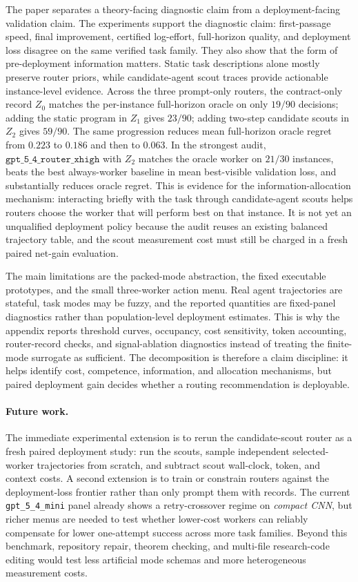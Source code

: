 \documentclass{article}
\begin{document}
The paper separates a theory-facing diagnostic claim from a deployment-facing validation claim.
The experiments support the diagnostic claim: first-passage speed, final improvement, certified log-effort, full-horizon quality, and deployment loss disagree on the same verified task family.
They also show that the form of pre-deployment information matters.
Static task descriptions alone mostly preserve router priors, while candidate-agent scout traces provide actionable instance-level evidence.
Across the three prompt-only routers, the contract-only record \(Z_0\) matches the per-instance full-horizon oracle on only \(19/90\) decisions; adding the static program in \(Z_1\) gives \(23/90\); adding two-step candidate scouts in \(Z_2\) gives \(59/90\).
The same progression reduces mean full-horizon oracle regret from \(0.223\) to \(0.186\) and then to \(0.063\).
In the strongest audit, \(\texttt{gpt\_5\_4\_router\_xhigh}\) with \(Z_2\) matches the oracle worker on \(21/30\) instances, beats the best always-worker baseline in mean best-visible validation loss, and substantially reduces oracle regret.
This is evidence for the information-allocation mechanism: interacting briefly with the task through candidate-agent scouts helps routers choose the worker that will perform best on that instance.
It is not yet an unqualified deployment policy because the audit reuses an existing balanced trajectory table, and the scout measurement cost must still be charged in a fresh paired net-gain evaluation.

The main limitations are the packed-mode abstraction, the fixed executable prototypes, and the small three-worker action menu.
Real agent trajectories are stateful, task modes may be fuzzy, and the reported quantities are fixed-panel diagnostics rather than population-level deployment estimates.
This is why the appendix reports threshold curves, occupancy, cost sensitivity, token accounting, router-record checks, and signal-ablation diagnostics instead of treating the finite-mode surrogate as sufficient.
The decomposition is therefore a claim discipline: it helps identify cost, competence, information, and allocation mechanisms, but paired deployment gain decides whether a routing recommendation is deployable.

\paragraph{Future work.}
The immediate experimental extension is to rerun the candidate-scout router as a fresh paired deployment study: run the scouts, sample independent selected-worker trajectories from scratch, and subtract scout wall-clock, token, and context costs.
A second extension is to train or constrain routers against the deployment-loss frontier rather than only prompt them with records.
The current \texttt{gpt\_5\_4\_mini} panel already shows a retry-crossover regime on \textit{compact CNN}, but richer menus are needed to test whether lower-cost workers can reliably compensate for lower one-attempt success across more task families.
Beyond this benchmark, repository repair, theorem checking, and multi-file research-code editing would test less artificial mode schemas and more heterogeneous measurement costs.
\end{document}
